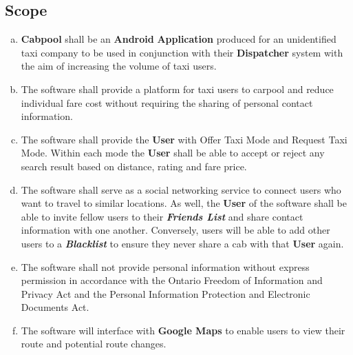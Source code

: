 \documentclass[english]{article}
\begin{document}
\subsection{Scope}
\label{sub:scope}
\begin{enumerate}[a)]
	\item \textbf{Cabpool} shall be an  \textbf{Android} \textbf{Application} produced for an unidentified taxi company to be used in conjunction with their \textbf{Dispatcher} system with the aim of increasing the volume of taxi users.  
	\item The software shall provide a platform for taxi users to carpool and reduce individual fare cost without requiring the sharing of personal contact information.
	\item The software shall provide the \textbf{User} with Offer Taxi Mode and Request Taxi Mode. Within each mode the \textbf{User} shall be able to accept or reject any search result based on distance, rating and fare price.
	\item The software shall serve as a social networking service to connect users who want to travel to similar locations. As well, the \textbf{User} of the software shall be able to invite fellow users to their \textbf{\emph{Friends List}} and share contact information with one another. Conversely, users will be able to add other users to a \textbf{\emph{Blacklist}} to ensure they never share a cab with that \textbf{User} again. 
	\item The software shall not provide personal information without express permission in accordance with the Ontario Freedom of Information and Privacy Act and the Personal Information Protection and Electronic Documents Act. 
	\item The software will interface with \textbf{Google Maps} to enable users to view their route and potential route changes.
	\end{enumerate}
\end{document}
